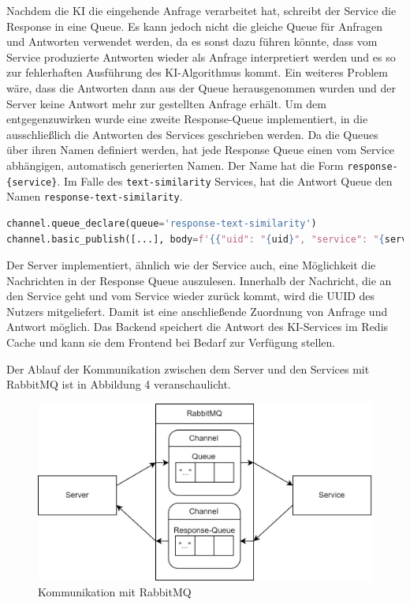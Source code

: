 Nachdem die KI die eingehende Anfrage verarbeitet hat, schreibt der Service die Response in eine Queue. Es kann jedoch nicht die gleiche Queue für Anfragen und Antworten verwendet werden, da es sonst dazu führen könnte, dass vom Service produzierte Antworten wieder als Anfrage interpretiert werden und es so zur fehlerhaften Ausführung des KI-Algorithmus kommt. Ein weiteres Problem wäre, dass die Antworten dann aus der Queue herausgenommen wurden und der Server keine Antwort mehr zur gestellten Anfrage erhält. Um dem entgegenzuwirken wurde eine zweite \glqq Response-Queue\grqq{} implementiert, in die ausschließlich die Antworten des Services geschrieben werden. Da die Queues über ihren Namen definiert werden, hat jede Response Queue einen vom Service abhängigen, automatisch generierten Namen. Der Name hat die Form \texttt{response-\{service\}}. Im Falle des \texttt{text-similarity} Services, hat die Antwort Queue den Namen \texttt{response-text-similarity}. 

\begin{lstlisting}[language=Python]
channel.queue_declare(queue='response-text-similarity')
channel.basic_publish([...], body=f'{{"uid": "{uid}", "service": "{service}", "message": {json.dumps(message)}}}'.encode('utf-8'))
\end{lstlisting}

Der Server implementiert, ähnlich wie der Service auch, eine Möglichkeit die Nachrichten in der Response Queue auszulesen. Innerhalb der Nachricht, die an den Service geht und vom Service wieder zurück kommt, wird die UUID des Nutzers mitgeliefert. Damit ist eine anschließende Zuordnung von Anfrage und Antwort möglich. Das Backend speichert die Antwort des KI-Services im Redis Cache und kann sie dem Frontend bei Bedarf zur Verfügung stellen.

Der Ablauf der Kommunikation zwischen dem Server und den Services mit RabbitMQ ist in Abbildung 4 veranschaulicht. 
\begin{figure}[H]
  \centering
    \includegraphics[width = 15cm]{bilder/Rabbit3}
    \caption{Kommunikation mit RabbitMQ}
\end{figure}

